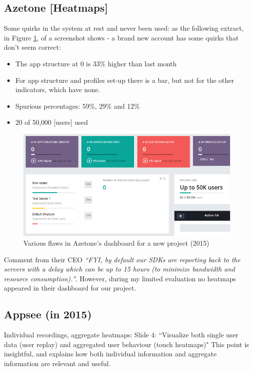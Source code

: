 \subsection{Azetone [Heatmaps]}
Some quirks in the system at rest and never been used: as the following extract, in Figure \ref{fig:azetone_dashboard_flaws_for_kiwix_2015}, of a screenshot shows - a brand new account has some quirks that don’t seem correct:
\begin{itemize}
    \item The app structure at 0 is 33\% higher than last month
    \item For app structure and profiles set-up there is a bar, but not for the other indicators, which have none.
    \item Spurious percentages: 59\%, 29\% and 12\%
    \item 20 of 50,000 [users] used
\end{itemize}

\begin{figure}[htbp!]
    \centering
    \includegraphics[width=12cm]{images/azetone/azetone_dashboard_flaws_for_kiwix_2015.png}
    \caption{Various flaws in Azetone's dashboard for a new project (2015)}
    \label{fig:azetone_dashboard_flaws_for_kiwix_2015}
\end{figure}

Comment from their CEO \emph{``FYI, by default our SDKs are reporting back to the servers with a delay which can be up to 15 hours (to minimize bandwidth and resource consumption)."}. However, during my limited evaluation no heatmaps appeared in their dashboard for our project.

\subsection{Appsee (in 2015)}
Individual recordings, aggregate heatmaps: Slide 4: ``Visualize both single user data (user replay) and aggregated user behaviour (touch heatmaps)" This point is insightful, and explains how both individual information and aggregate information are relevant and useful.

